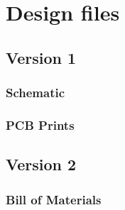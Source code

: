 \chapter{Design files}\label{ch:appendix-design}

\section{Version 1}\label{sec:appendix-v1}

\subsection{Schematic}\label{sub:schem-v1}



\subsection{PCB Prints}\label{sub:prints-v1}



\section{Version 2}\label{sec:appendix-v2}

\subsection{Bill of Materials}\label{sub:bom-v2}


